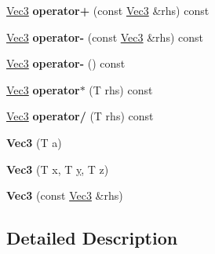 \begin{DoxyCompactItemize}
\item 
\hypertarget{class_h_a_c_d_1_1_vec3_a8f4282cd03467c68be14edbe10ed8a1b}{\hyperlink{class_h_a_c_d_1_1_vec3}{Vec3} {\bfseries operator+} (const \hyperlink{class_h_a_c_d_1_1_vec3}{Vec3} \&rhs) const }\label{class_h_a_c_d_1_1_vec3_a8f4282cd03467c68be14edbe10ed8a1b}

\item 
\hypertarget{class_h_a_c_d_1_1_vec3_a055cdcbb0f40066efac75cdb3891bf73}{\hyperlink{class_h_a_c_d_1_1_vec3}{Vec3} {\bfseries operator-\/} (const \hyperlink{class_h_a_c_d_1_1_vec3}{Vec3} \&rhs) const }\label{class_h_a_c_d_1_1_vec3_a055cdcbb0f40066efac75cdb3891bf73}

\item 
\hypertarget{class_h_a_c_d_1_1_vec3_a5db2d2e746f6c4cc563bec2fc5aa906e}{\hyperlink{class_h_a_c_d_1_1_vec3}{Vec3} {\bfseries operator-\/} () const }\label{class_h_a_c_d_1_1_vec3_a5db2d2e746f6c4cc563bec2fc5aa906e}

\item 
\hypertarget{class_h_a_c_d_1_1_vec3_a6860dfd9e336e057e8cc8a892b19a969}{\hyperlink{class_h_a_c_d_1_1_vec3}{Vec3} {\bfseries operator$\ast$} (T rhs) const }\label{class_h_a_c_d_1_1_vec3_a6860dfd9e336e057e8cc8a892b19a969}

\item 
\hypertarget{class_h_a_c_d_1_1_vec3_a8c27ac0c04f95c54b6b1351e90c6e8b1}{\hyperlink{class_h_a_c_d_1_1_vec3}{Vec3} {\bfseries operator/} (T rhs) const }\label{class_h_a_c_d_1_1_vec3_a8c27ac0c04f95c54b6b1351e90c6e8b1}

\item 
\hypertarget{class_h_a_c_d_1_1_vec3_afa4fa413c7cd60e6773997ad4b8c441e}{{\bfseries Vec3} (T a)}\label{class_h_a_c_d_1_1_vec3_afa4fa413c7cd60e6773997ad4b8c441e}

\item 
\hypertarget{class_h_a_c_d_1_1_vec3_acbb20bf16e028e9a11e825e903f19550}{{\bfseries Vec3} (T x, T \hyperlink{_ice_utils_8h_aa7ffaed69623192258fb8679569ff9ba}{y}, T z)}\label{class_h_a_c_d_1_1_vec3_acbb20bf16e028e9a11e825e903f19550}

\item 
\hypertarget{class_h_a_c_d_1_1_vec3_a003be8395d1e17ff97a4e89c69c1abb7}{{\bfseries Vec3} (const \hyperlink{class_h_a_c_d_1_1_vec3}{Vec3} \&rhs)}\label{class_h_a_c_d_1_1_vec3_a003be8395d1e17ff97a4e89c69c1abb7}

\end{DoxyCompactItemize}


\subsection{Detailed Description}
